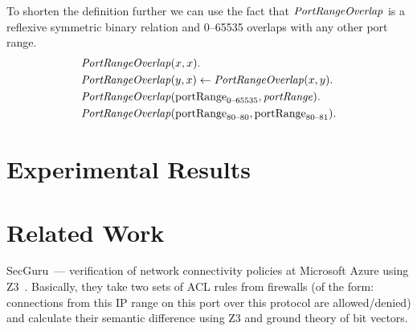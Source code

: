 To shorten the definition further we can use the fact that $\mathit{PortRangeOverlap}$ is a reflexive symmetric binary relation and 0--65535 overlaps with any other port range.
\begin{equation*}
\begin{aligned}
&\mathit{PortRangeOverlap}(x,x).\\
&\mathit{PortRangeOverlap}(y,x)\leftarrow\mathit{PortRangeOverlap}(x,y).\\
&\mathit{PortRangeOverlap}(\mathrm{portRange}_\text{0--65535},\mathit{portRange}).\\
&\mathit{PortRangeOverlap}(\mathrm{portRange}_\text{80--80},\mathrm{portRange}_\text{80--81}).\\
\end{aligned}
\end{equation*}

\section{Experimental Results}
\label{sect:aws/experiments}


\section{Related Work}
\label{sect:aws/related}

SecGuru~--- verification of network connectivity policies at Microsoft Azure using Z3~\cite{jayaraman2014automated}. Basically, they take two sets of ACL rules from firewalls (of the form: connections from this IP range on this port over this protocol are allowed/denied) and calculate their semantic difference using Z3 and ground theory of bit vectors.

